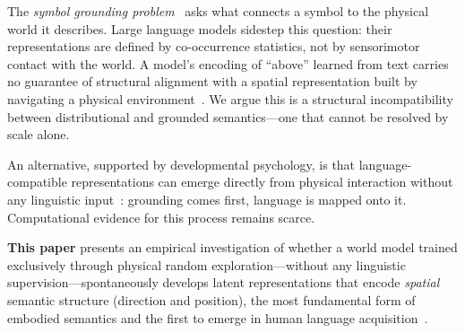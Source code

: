 \documentclass{article}
\begin{document}
The \emph{symbol grounding problem}~\cite{harnad1990symbol} asks
what connects a symbol to the physical world it describes.
Large language models sidestep this question: their representations
are defined by co-occurrence statistics, not by sensorimotor contact
with the world.
A model's encoding of ``above'' learned from text carries no guarantee
of structural alignment with a spatial representation built by
navigating a physical environment~\cite{brohan2023rt2}.
We argue this is a structural incompatibility between distributional
and grounded semantics---one that cannot be resolved by scale alone.

An alternative, supported by developmental psychology, is that
language-compatible representations can emerge directly from physical
interaction without any linguistic input~\cite{piaget1952origins,tomasello1999cultural}:
grounding comes first, language is mapped onto it.
Computational evidence for this process remains scarce.

\textbf{This paper} presents an empirical investigation of whether a world
model trained exclusively through physical random exploration---without
any linguistic supervision---spontaneously develops latent representations
that encode \emph{spatial} semantic structure (direction and position),
the most fundamental form of embodied semantics and the first to emerge
in human language acquisition~\cite{piaget1952origins}.
\end{document}
